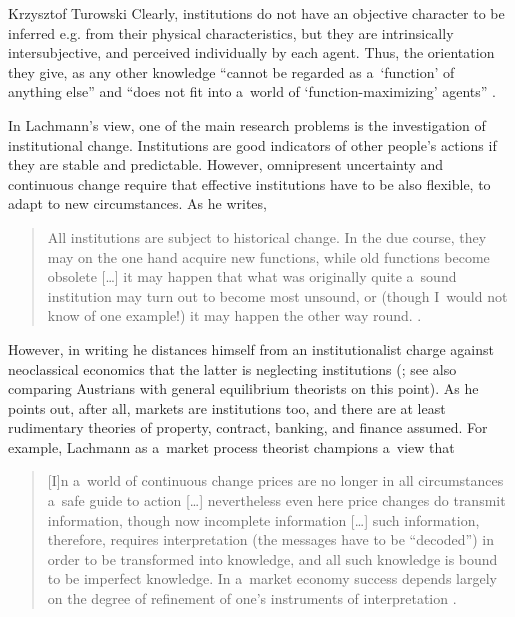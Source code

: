 \begin{artengenv}{Krzysztof Turowski}
Clearly, institutions do not have an objective character to be inferred e.g. from their physical characteristics, but they are intrinsically intersubjective, and perceived individually by each agent. Thus, the orientation they give, as any other knowledge ``cannot be regarded as a~`function' of anything else'' and ``does not fit into a~world of `function-maximizing' agents'' \parencite[277]{lachmann-hermeneutic}.

In Lachmann's view, one of the main research problems is the investigation of institutional change. Institutions are good indicators of other people's actions if they are stable and predictable.
However, omnipresent uncertainty and continuous change require that effective institutions have to be also flexible, to adapt to new circumstances. As he writes,
\begin{quote}
All institutions are subject to historical change. In the due course, they may on the one hand acquire new functions, while old functions become obsolete [\ldots] it may happen that what was originally quite a~sound institution may turn out to become most unsound, or (though I~would not know of one example!) it may happen the other way round. \parencite[177]{lachmann1962cost}.
\end{quote}

However, in writing he distances himself from an institutionalist charge against neoclassical economics that the latter is neglecting institutions (\cite[275]{lachmann-hermeneutic}; see also \cite[499]{udehn} comparing Austrians with general equilibrium theorists on this point).
As he points out, after all, markets are institutions too, and there are at least rudimentary theories of property, contract, banking, and finance assumed.
For example, Lachmann as a~market process theorist champions a~view that
\begin{quote}
[I]n a~world of continuous change prices are no longer in all circumstances a~safe guide to action [\ldots] nevertheless even here price changes do transmit information, though now incomplete information [\ldots] such information, therefore, requires interpretation (the messages have to be ``decoded'') in order to be transformed into knowledge, and all such knowledge is bound to be imperfect knowledge. In a~market economy success depends largely on the degree of refinement of one's instruments of interpretation \parencite[22]{lachmann1956capital}.
\end{quote}


\end{artengenv}
